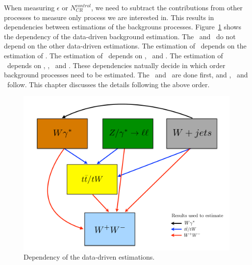 When measuring $\epsilon$ or $N_{CR}^{control}$, we need to subtract 
the contributions from other processes to measure only process we 
are interested in. This results in dependencies between estimations 
of the backgrouns processes. Figure~\ref{fig:bkgest_dependency} shows 
the dependency of the data-driven background estimation. 
The \dyll\ and \Wjets\ do not depend on the other data-driven estimations.
The estimation of \wgammastar\ depends on the estimation of \Wjets. 
The estimation of \topbkg\ depends on \wgammastar, \dyll\ and \Wjets. 
The estimation of \qqww\ depends on \wgammastar, \dyll,  \Wjets\ and \topbkg. 
These dependencies natually decide in which order background processes
need to be estimated. The \dyll\ and \Wjets\ are done first, 
and \wgammastar, \topbkg\ and \qqww\ follow. This chapter discusses 
the details following the above order. 
\begin{figure}[ht!] 
\centering 
\includegraphics[width=0.99\textwidth]{figures/bkgest_schematic.pdf} 
\caption{Dependency of the data-driven estimations.} 
\label{fig:bkgest_dependency} 
\end{figure} 

\section{ \dyll }

